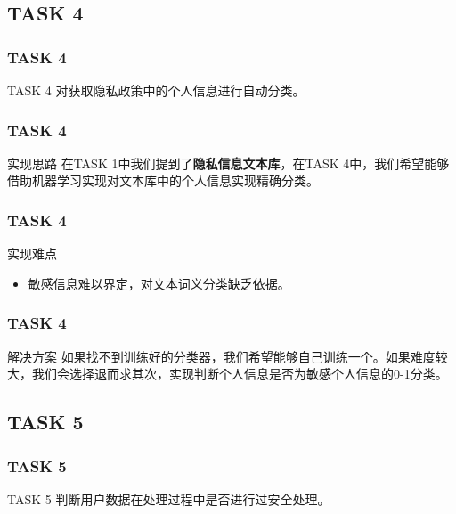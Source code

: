 \documentclass[10pt]{ctexbeamer}
\begin{document}
    \subsection{TASK 4}
    \begin{frame}
        \frametitle{TASK 4}
    
        \begin{block}{TASK 4}
            对获取隐私政策中的个人信息进行自动分类。
        \end{block}
    \end{frame}

    \begin{frame}
        \frametitle{TASK 4}
    
        \begin{block}{实现思路}
            在TASK 1中我们提到了\textbf{隐私信息文本库}，在TASK 4中，我们希望能够借助机器学习实现对文本库中的个人信息实现精确分类。
        \end{block}
    \end{frame}

    \begin{frame}
        \frametitle{TASK 4}
        \begin{block}{实现难点}
            \begin{itemize}
                \item 敏感信息难以界定，对文本词义分类缺乏依据。
            \end{itemize}
        \end{block}
    
    \end{frame}
    
    \begin{frame}
        \frametitle{TASK 4}
        \begin{block}{解决方案}
            如果找不到训练好的分类器，我们希望能够自己训练一个。如果难度较大，我们会选择退而求其次，实现判断个人信息是否为敏感个人信息的0-1分类。
        \end{block}
    \end{frame}

    \subsection{TASK 5}
    \begin{frame}
        \frametitle{TASK 5}
        \begin{block}{TASK 5}
            判断用户数据在处理过程中是否进行过安全处理。
        \end{block} 
    \end{frame}
\end{document}
